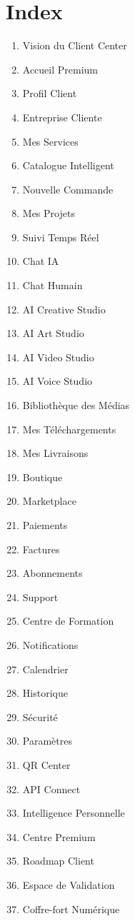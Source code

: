 \documentclass[12pt,a4paper,oneside]{book}
\begin{document}
\chapter{Index}
\begin{enumerate}
\item Vision du Client Center
\item Accueil Premium
\item Profil Client
\item Entreprise Cliente
\item Mes Services
\item Catalogue Intelligent
\item Nouvelle Commande
\item Mes Projets
\item Suivi Temps Réel
\item Chat IA
\item Chat Humain
\item AI Creative Studio
\item AI Art Studio
\item AI Video Studio
\item AI Voice Studio
\item Bibliothèque des Médias
\item Mes Téléchargements
\item Mes Livraisons
\item Boutique
\item Marketplace
\item Paiements
\item Factures
\item Abonnements
\item Support
\item Centre de Formation
\item Notifications
\item Calendrier
\item Historique
\item Sécurité
\item Paramètres
\item QR Center
\item API Connect
\item Intelligence Personnelle
\item Centre Premium
\item Roadmap Client
\item Espace de Validation
\item Coffre-fort Numérique
\end{enumerate}
\end{document}
